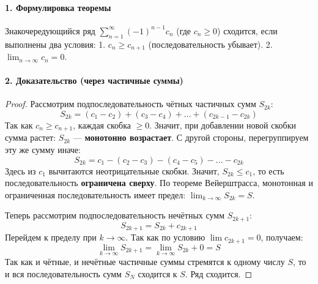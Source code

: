 \vspace{0.5em}
\begin{center}
\end{center}
\vspace{0.5em}

\paragraph{1. Формулировка теоремы}
Знакочередующийся ряд $\sum_{n=1}^{\infty} (-1)^{n-1} c_n$ (где $c_n \ge 0$) сходится, если выполнены два условия:
1. $c_n \ge c_{n+1}$ (последовательность убывает).
2. $\lim_{n \to \infty} c_n = 0$.

\paragraph{2. Доказательство (через частичные суммы)}
\begin{proof}
Рассмотрим подпоследовательность чётных частичных сумм $S_{2k}$:
$$ S_{2k} = (c_1 - c_2) + (c_3 - c_4) + \dots + (c_{2k-1} - c_{2k}) $$
Так как $c_n \ge c_{n+1}$, каждая скобка $\ge 0$. Значит, при добавлении новой скобки сумма растет: $S_{2k}$ — \textbf{монотонно возрастает}.
С другой стороны, перегруппируем эту же сумму иначе:
$$ S_{2k} = c_1 - (c_2 - c_3) - (c_4 - c_5) - \dots - c_{2k} $$
Здесь из $c_1$ вычитаются неотрицательные скобки. Значит, $S_{2k} \le c_1$, то есть последовательность \textbf{ограничена сверху}.
По теореме Вейерштрасса, монотонная и ограниченная последовательность имеет предел: $\lim_{k \to \infty} S_{2k} = S$.

Теперь рассмотрим подпоследовательность нечётных сумм $S_{2k+1}$:
$$ S_{2k+1} = S_{2k} + c_{2k+1} $$
Перейдем к пределу при $k \to \infty$. Так как по условию $\lim c_{2k+1} = 0$, получаем:
$$ \lim_{k \to \infty} S_{2k+1} = \lim_{k \to \infty} S_{2k} + 0 = S $$
Так как и чётные, и нечётные частичные суммы стремятся к одному числу $S$, то и вся последовательность сумм $S_N$ сходится к $S$. Ряд сходится.
\end{proof}

